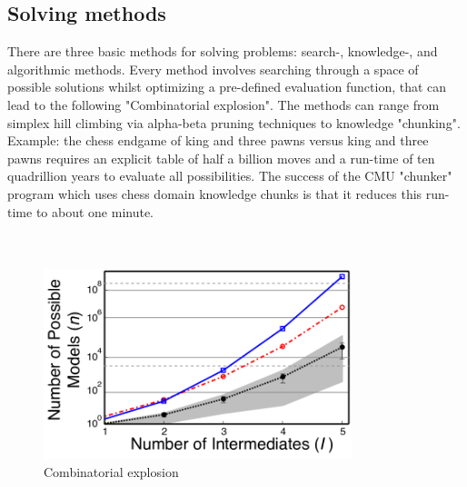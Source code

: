 \subsection{Solving methods}
There are three basic methods for solving problems: search-, knowledge-, and algorithmic methods. Every method involves searching through a space of possible solutions whilst optimizing a pre-defined evaluation function, that can lead to the following "Combinatorial explosion". The methods can range from simplex hill climbing via alpha-beta pruning techniques to knowledge "chunking". 
Example: the chess endgame of king and three pawns versus king and three pawns requires an explicit table of half a billion moves and a run-time of ten quadrillion years to evaluate all possibilities. The success of the CMU "chunker" program which uses chess domain knowledge chunks is that it reduces this run-time to about one minute.
\\
\\
\\
\begin{figure}[htb]
    \centering
    \includegraphics[width=0.8\textwidth]{pics/combiexplo.png}
    \caption{Combinatorial explosion} 
\end{figure}

